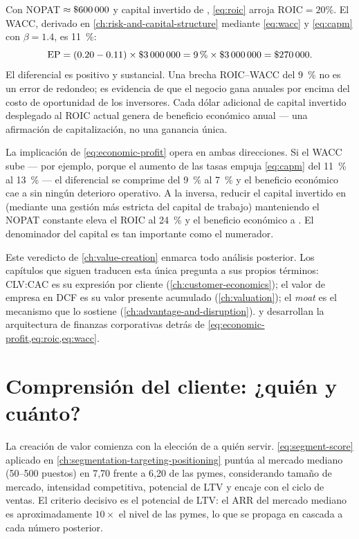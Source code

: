 Con NOPAT \(\approx\$\num{600000}\) y capital invertido de ,
\cref{eq:roic} arroja \(\mathrm{ROIC}=20\%\). El WACC, derivado en \cref{ch:risk-and-capital-structure}
mediante \cref{eq:wacc} y \cref{eq:capm} con \(\beta=1.4\), es \qty{11}{\percent}:
\[
  \mathrm{EP}
    = (0.20 - 0.11)\times\$\num{3000000}
    = \qty{9}{\percent}\times\$\num{3000000}
    = \$\num{270000}.
\]
El diferencial es positivo y sustancial. Una brecha ROIC--WACC del \qty{9}{\percent} no es un
error de redondeo; es evidencia de que el negocio gana  anuales por encima del
costo de oportunidad de los inversores. Cada dólar adicional de capital invertido desplegado
al ROIC actual genera  de beneficio económico anual --- una afirmación de
capitalización, no una ganancia única.

La implicación de \cref{eq:economic-profit} opera en ambas direcciones. Si el WACC sube ---
por ejemplo, porque el aumento de las tasas empuja \cref{eq:capm} del \qty{11}{\percent} al
\qty{13}{\percent} --- el diferencial se comprime del \qty{9}{\percent} al \qty{7}{\percent} y el
beneficio económico cae a  sin ningún deterioro operativo. A la inversa, reducir el
capital invertido en  (mediante una gestión más estricta del capital de trabajo)
manteniendo el NOPAT constante eleva el ROIC al \qty{24}{\percent} y el beneficio económico a
. El denominador del capital es tan importante como el numerador.

Este veredicto de \cref{ch:value-creation} enmarca todo análisis posterior. Los capítulos que
siguen traducen esta única pregunta a sus propios términos: CLV:CAC es su expresión por cliente
(\cref{ch:customer-economics}); el valor de empresa en DCF es su valor presente acumulado
(\cref{ch:valuation}); el \emph{moat} es el mecanismo que lo sostiene
(\cref{ch:advantage-and-disruption}). \textcite{brealey2020} y \textcite{damodaran2012}
desarrollan la arquitectura de finanzas corporativas detrás de \cref{eq:economic-profit,eq:roic,eq:wacc}.

\section{Comprensión del cliente: ¿quién y cuánto?}\label{sec:capstone-customer}

La creación de valor comienza con la elección de a quién servir. \cref{eq:segment-score} aplicado en
\cref{ch:segmentation-targeting-positioning} puntúa al mercado mediano (50--500 puestos) en 7,70
frente a 6,20 de las pymes, considerando tamaño de mercado, intensidad competitiva, potencial
de LTV y encaje con el ciclo de ventas. El criterio decisivo es el potencial de LTV: el ARR del
mercado mediano es aproximadamente \(10\times\) el nivel de las pymes, lo que se propaga en
cascada a cada número posterior.

